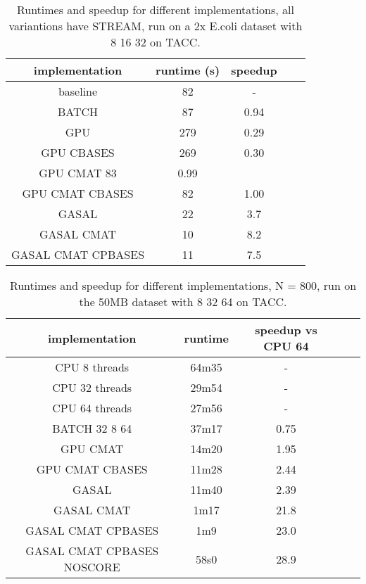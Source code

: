 \documentclass[../main/thesis.tex]{subfiles}
\begin{document}
\begin{table}
\centering
\caption{Runtimes and speedup for different implementations, all variantions have STREAM, run on a 2x E.coli dataset with 8 16 32 on TACC.}
\label{tbl:darwin1}
\begin{tabular}{c c c c c}
implementation & runtime (s) & speedup \\ \hline
baseline & 82 & -\\
BATCH & 87 & 0.94 \\
GPU & 279 & 0.29 \\
GPU CBASES & 269 & 0.30 \\
GPU CMAT 83 & 0.99 \\
GPU CMAT CBASES & 82 & 1.00 \\
GASAL & 22 & 3.7 \\
GASAL CMAT & 10 & 8.2 \\
GASAL CMAT CPBASES & 11 & 7.5 \\
\end{tabular}
\end{table}

\begin{table}
\centering
\caption{Runtimes and speedup for different implementations, N = 800, run on the 50MB dataset with 8 32 64 on TACC.}
\label{tbl:darwin2}
\begin{tabular}{c c c c c}
implementation & runtime & speedup vs CPU 64 \\ \hline
CPU 8 threads & 64m35 & - \\
CPU 32 threads & 29m54 & - \\
CPU 64 threads & 27m56 & - \\
BATCH 32 8 64 & 37m17 & 0.75 \\
GPU CMAT & 14m20 & 1.95 \\
GPU CMAT CBASES & 11m28 & 2.44 \\
GASAL & 11m40 & 2.39 \\
GASAL CMAT & 1m17 & 21.8 \\
GASAL CMAT CPBASES & 1m9 & 23.0 \\
GASAL CMAT CPBASES NOSCORE & 58s0 & 28.9 \\
\end{tabular}
\end{table}
\end{document}
